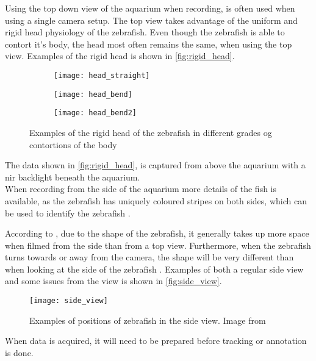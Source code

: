 Using the top down view of the aquarium when recording, is often used when using a single camera setup. The top view takes advantage of the uniform and rigid head physiology of the zebrafish. Even though the zebrafish is able to contort it's body, the head most often remains the same, when using the top view. Examples of the rigid head is shown in \autoref{fig:rigid_head}.

\begin{figure}[H]
	\centering
	\begin{subfigure}[b]{0.3\textwidth}
		\texttt{[image: head\_straight]}
		\label{fig:head_straight}
	\end{subfigure}
	\begin{subfigure}[b]{0.3\textwidth}
		\texttt{[image: head\_bend]}
		\label{fig:head_bend}
	\end{subfigure}
	\begin{subfigure}[b]{0.3\textwidth}
		\texttt{[image: head\_bend2]}
		\label{fig:head_bend2}
	\end{subfigure}
\caption{Examples of the rigid head of the zebrafish in different grades og contortions of the body}
\label{fig:rigid_head}
\end{figure}

The data shown in \autoref{fig:rigid_head}, is captured from above the aquarium with a \gls{nir} backlight beneath the aquarium.\\

When recording from the side of the aquarium more details of the fish is available, as the zebrafish has uniquely coloured stripes on both sides, which can be used to identify the zebrafish \citep{Karpova2018}.

According to \cite{Qian2017}, due to the shape of the zebrafish, it generally takes up more space when filmed from the side than from a top view. Furthermore, when the zebrafish turns towards or away from the camera, the shape will be very different than when looking at the side of the zebrafish \citep{Pedersen2017}. Examples of both a regular side view and some issues from the view is shown in \autoref{fig:side_view}.

\begin{figure}[H]
	\centering
	\texttt{[image: side\_view]}
	\caption{Examples of positions of zebrafish in the side view. Image from \cite{Pedersen2017}}
	\label{fig:side_view}
\end{figure}

When data is acquired, it will need to be prepared before tracking or annotation is done. 


